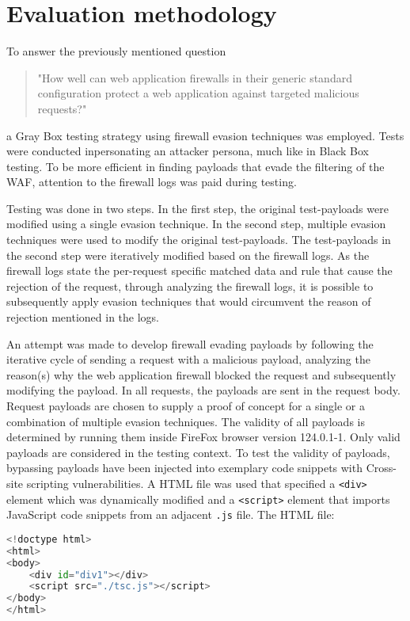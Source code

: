\section{Evaluation methodology}
\label{sec:evaluation}
To answer the previously mentioned question
\begin{quote} "How well can web application firewalls in their generic standard configuration protect a web application against targeted malicious requests?"
\end{quote}
a Gray Box testing strategy using firewall evasion techniques was employed. Tests were conducted inpersonating an attacker persona, much like in Black Box testing.
To be more efficient in finding payloads that evade the filtering of the WAF, attention to the firewall logs was paid during testing.

Testing was done in two steps. In the first step, the original test-payloads were modified using a single evasion technique.
In the second step, multiple evasion techniques were used to modify the original test-payloads.
The test-payloads in the second step were iteratively modified based on the firewall logs.
As the firewall logs state the per-request specific matched data and rule that cause the rejection of the request, through analyzing the firewall logs, it is possible to subsequently apply evasion techniques that would circumvent the reason of rejection mentioned in the logs.

An attempt was made to develop firewall evading payloads by following the iterative cycle of sending a request with a malicious payload, analyzing the reason(s) why the web application firewall blocked the request and subsequently modifying the payload. In all requests, the payloads are sent in the request body.
Request payloads are chosen to supply a proof of concept for a single or a combination of multiple evasion techniques. The validity of all payloads is determined by running them inside FireFox browser version 124.0.1-1. Only valid payloads are considered in the testing context. %
To test the validity of payloads, bypassing payloads have been injected into exemplary code snippets with Cross-site scripting vulnerabilities. A HTML file was used that specified a \verb|<div>| element which was dynamically modified and a \verb|<script>| element that imports JavaScript code snippets from an adjacent \verb|.js| file. The HTML file:

\begin{lstlisting}[style=basicStyle, language=Python]
<!doctype html>
<html>
<body>
	<div id="div1"></div>
	<script src="./tsc.js"></script>
</body>
</html>
\end{lstlisting}

